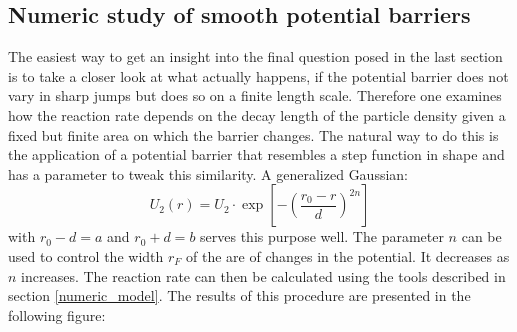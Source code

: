 \newpage
\subsection{Numeric study of smooth potential barriers}

The easiest way to get an insight into the final question posed in the last section is to take a closer look at what actually happens, if the potential barrier does not vary in sharp jumps but does so on a finite length scale.
Therefore one examines how the reaction rate depends on the decay length of the particle density given a fixed but finite area on which the barrier changes. The natural way to do this is the application of a potential barrier that resembles a step function in shape and has a parameter to tweak this similarity. A generalized Gaussian:
\begin{equation}
    U_2(r) = U_2 \cdot \exp \left[ - \left( \frac{r_0 - r}{d} \right)^{2n} \right]
    \label{generalized_gaussian}
\end{equation}
with $r_0-d=a$ and $r_0+d=b$ serves this purpose well. The parameter $n$ can be used to control the width $r_F$ of the are of changes in the potential. It decreases as $n$ increases. The reaction rate can then be calculated using the tools described in section \ref{numeric_model}. The results of this procedure are presented in the following figure: \vspace{-0.5 cm}\\

